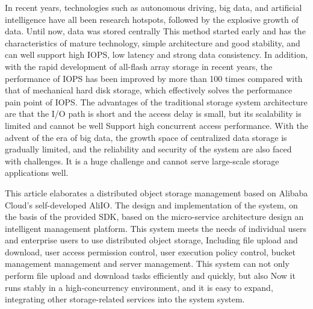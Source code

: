 \begin{abstract*}


  In recent years, technologies such as autonomous driving, big data, and artificial intelligence have all been research hotspots, followed by the explosive growth of data. Until now, data was stored centrally
  This method started early and has the characteristics of mature technology, simple architecture and good stability, and can well support high IOPS, low latency and strong data consistency. In addition, with the rapid development of all-flash array storage in recent years, the performance of IOPS has been improved by more than 100 times compared with that of mechanical hard disk storage, which effectively solves the performance pain point of IOPS. The advantages of the traditional storage system architecture are that the I/O path is short and the access delay is small, but its scalability is limited and cannot be well
  Support high concurrent access performance. With the advent of the era of big data, the growth space of centralized data storage is gradually limited, and the reliability and security of the system are also faced with challenges.
  It is a huge challenge and cannot serve large-scale storage applications well.

  This article elaborates a distributed object storage management based on Alibaba Cloud's self-developed AliIO.
  The design and implementation of the system, on the basis of the provided SDK, based on the micro-service architecture design an intelligent
  management platform. This system meets the needs of individual users and enterprise users to use distributed object storage,
  Including file upload and download, user access permission control, user execution policy control, bucket management
  management and server management. This system can not only perform file upload and download tasks efficiently and quickly, but also
  Now it runs stably in a high-concurrency environment, and it is easy to expand, integrating other storage-related services into the system
  system.
\end{abstract*}

